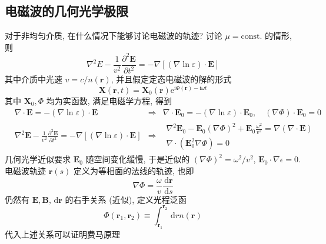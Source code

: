 \documentclass[12pt,a4paper]{article}%
\numberwithin{equation}{section}%
\renewcommand*{\vec}[1]{\bm{#1}}%
\newcommand{\dif}{\,\mathrm d}
\newcommand\mi{\mathrm{i}}
\newcommand\e{\mathrm{e}}%
\begin{document}
\subsection{电磁波的几何光学极限} %
\label{sub:limit_geometry}
    对于非均匀介质, 在什么情况下能够讨论电磁波的轨迹? 
    讨论 $\mu = \mbox{const.}$ 的情形, 则
    \begin{equation}
        \nabla^2 E - \frac 1{v^2}\frac{\partial^2\vec E}{\partial t^2} 
        = -\nabla\left[(\nabla\ln\varepsilon)\cdot\vec E\right]
    \end{equation}
    其中介质中光速 $v = c/n(\vec r)$, 并且假定定态电磁波的解的形式
    \begin{equation}
        \vec X(\vec r, t) = \vec X_0(\vec r) \e^{\mi\Phi(\vec r) - \mi\omega t}
    \end{equation}
    其中 $\vec X_0, \Phi$ 均为实函数, 满足电磁学方程, 得到
    \begin{align}
        &\nabla\cdot\vec E = -(\nabla\ln\varepsilon)\cdot\vec E
        &\Rightarrow& \nabla\cdot\vec E_0 = -\left(\nabla\ln\varepsilon\right)\cdot\vec E_0, \quad (\nabla\Phi)\cdot\vec E_0 = 0 \\
        &\nabla^2 \vec E - \frac 1{v^2}\frac{\partial^2\vec E}{\partial t^2} 
        = -\nabla\left[(\nabla\ln\varepsilon)\cdot\vec E\right]
        &\Rightarrow& \begin{array}{l}
            \nabla^2\vec E_0 - \vec E_0\left(\nabla\Phi\right)^2+ \vec E_0\frac{\omega^2}{v^2} = \nabla(\nabla\cdot\vec E) \\
            \nabla\cdot(\vec E_0^2\nabla\Phi) = 0
        \end{array}
    \end{align}
    几何光学近似要求 $\vec E_0$ 随空间变化缓慢, 于是近似的 $(\nabla\Phi)^2 = \omega^2/v^2$, $\vec E_0\cdot\nabla\epsilon = 0$.\\
    电磁波轨迹 $\vec r(s)$ 定义为等相面的法线的轨迹, 也即
    \begin{equation}
        \nabla\Phi = \frac\omega v\frac{\dif\vec r}{\dif s}
    \end{equation}
    仍然有 $\vec E, \vec B, \dif\vec r$ 的右手关系 (近似), 定义光程泛函
    \begin{equation}
        \Phi(\vec r_1, \vec r_2)\equiv\int_{\vec r_1}^{\vec r_2}\dif r n(\vec r)
    \end{equation}
    代入上述关系可以证明费马原理
\end{document}
